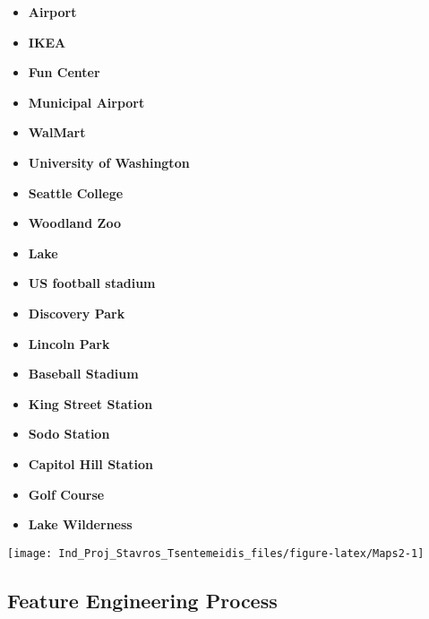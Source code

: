 \documentclass[]{article}
\providecommand{\tightlist}{%
  \setlength{\itemsep}{0pt}\setlength{\parskip}{0pt}}
\begin{document}
\begin{itemize}
\tightlist
\item
  \textbf{Airport}\\
\item
  \textbf{IKEA}\\
\item
  \textbf{Fun Center}\\
\item
  \textbf{Municipal Airport}\\
\item
  \textbf{WalMart}\\
\item
  \textbf{University of Washington}\\
\item
  \textbf{Seattle College}\\
\item
  \textbf{Woodland Zoo}\\
\item
  \textbf{Lake}\\
\item
  \textbf{US football stadium}\\
\item
  \textbf{Discovery Park}\\
\item
  \textbf{Lincoln Park}\\
\item
  \textbf{Baseball Stadium}\\
\item
  \textbf{King Street Station}\\
\item
  \textbf{Sodo Station}\\
\item
  \textbf{Capitol Hill Station}\\
\item
  \textbf{Golf Course}
\item
  \textbf{Lake Wilderness}
\end{itemize}

\begin{center}\texttt{[image: Ind\_Proj\_Stavros\_Tsentemeidis\_files/figure-latex/Maps2-1]} \end{center}

\hypertarget{feature-engineering-process}{%
\subsection{Feature Engineering
Process}\label{feature-engineering-process}}
\end{document}
